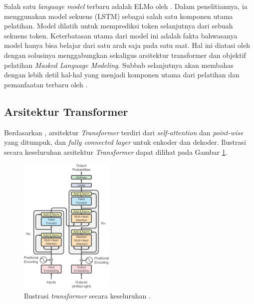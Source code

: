     Salah satu \textit{language model} terbaru adalah ELMo oleh \parencite{Peters_Neumann_Iyyer_Gardner_Clark_Lee_Zettlemoyer_2018}. Dalam penelitiannya, ia menggunakan model sekuens  (LSTM) \parencite{Hochreiter_Schmidhuber_1997}  sebagai salah satu komponen utama pelatihan. Model dilatih untuk memprediksi token selanjutnya dari sebuah sekuens token. Keterbatasan utama dari model ini adalah fakta bahwasanya model hanya bisa belajar dari satu arah saja pada satu saat. Hal ini diatasi oleh \parencite{Devlin_Chang_Lee_Toutanova_2019} dengan solusinya menggabungkan sekaligus arsitektur transformer dan objektif pelatihan \textit{Masked Language Modeling}. Subbab selanjutnya akan membahas dengan lebih detil hal-hal yang menjadi komponen utama dari pelatihan dan pemanfaatan  terbaru oleh \parencite{Devlin_Chang_Lee_Toutanova_2019}.

    \subsection{Arsitektur Transformer}
    Berdasarkan \parencite{AttentionVaswani2017}, arsitektur \textit{Transformer} terdiri dari \textit{self-attention} dan \textit{point-wise} yang ditumpuk, dan \textit{fully connected layer} untuk enkoder dan dekoder. Ilustrasi secara keseluruhan arsitektur \textit{Transformer} dapat dilihat pada Gambar \ref{fig:ilustrasi_transformer}.

    \begin{figure}[ht]
        \centering
        \includegraphics[width=0.4\textwidth]{resources/overview-transformer.png}
        \caption{Ilustrasi \textit{transformer} secara keseluruhan \parencite{AttentionVaswani2017}.}
        \label{fig:ilustrasi_transformer}
    \end{figure}

